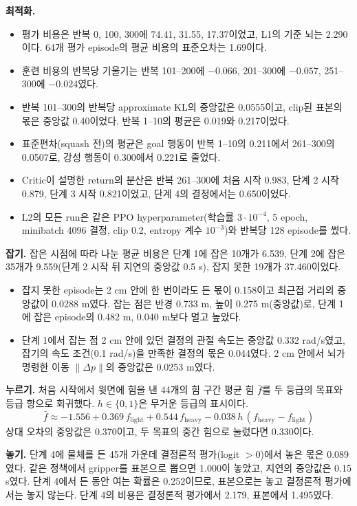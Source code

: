 \documentclass[11pt]{article}\usepackage[margin=1in]{geometry}\usepackage{amsmath,amssymb,amsthm,mathtools}\usepackage{graphicx}\graphicspath{{figures/}{../figures/}{figs/}{./}}\usepackage{enumitem}\usepackage{hyperref}\usepackage{cleveref}\usepackage{tikz}\usetikzlibrary{arrows.meta,positioning,calc,shapes.geometric}\usepackage{float}\usepackage{rotating}\usepackage[most]{tcolorbox}\usepackage{kotex}\usepackage{booktabs}\usepackage{longtable}\emergencystretch=1.6em\tolerance=2000 \crefname{assumption}{Assumption}{Assumptions}\Crefname{assumption}{Assumption}{Assumptions}\crefname{definition}{Definition}{Definitions}\Crefname{definition}{Definition}{Definitions}\crefname{proposition}{Proposition}{Propositions}\Crefname{proposition}{Proposition}{Propositions}\crefname{fact}{Fact}{Facts}\Crefname{fact}{Fact}{Facts} \newtheorem{assumption}{Assumption}\newtheorem{definition}{Definition}\newtheorem{lemma}{Lemma}\newtheorem{proposition}{Proposition}\newtheorem{theorem}{Theorem}\newtheorem{corollary}{Corollary}\newtheorem{fact}{Fact}\theoremstyle{remark}\newtheorem{remark}{Remark} \newcommand{\R}{\mathbb{R}}\newcommand{\xb}{\bar x}\newcommand{\Ab}{\bar A}\newcommand{\By}{\bar B_y}\newcommand{\U}{\mathcal U}\newcommand{\Z}{\mathcal Z}
\begin{document}
\textbf{최적화.}
\begin{itemize}
\item 평가 비용은 반복 0, 100, 300에 74.41, 31.55, 17.37이었고, L1의 기준 뇌는 2.290이다. 64개 평가 episode의 평균 비용의 표준오차는 1.69이다.
\item 훈련 비용의 반복당 기울기는 반복 101--200에 $-0.066$, 201--300에 $-0.057$, 251--300에 $-0.024$였다.
\item 반복 101--300의 반복당 approximate KL의 중앙값은 0.0555이고, clip된 표본의 몫은 중앙값 0.40이었다. 반복 1--10의 평균은 0.019와 0.217이었다.
\item 표준편차(squash 전)의 평균은 goal 행동이 반복 1--10의 0.211에서 261--300의 0.0507로, 강성 행동이 0.300에서 0.221로 줄었다.
\item Critic이 설명한 return의 분산은 반복 261--300에 처음 시작 0.983, 단계 2 시작 0.879, 단계 3 시작 0.821이었고, 단계 4의 결정에서는 0.650이었다.
\item L2의 모든 run은 같은 PPO hyperparameter(학습률 $3\cdot10^{-4}$, 5 epoch, minibatch 4096 결정, clip 0.2, entropy 계수 $10^{-3}$)와 반복당 128 episode를 썼다.
\end{itemize}

\textbf{잡기.} 잡은 시점에 따라 나눈 평균 비용은 단계 1에 잡은 10개가 6.539, 단계 2에 잡은 35개가 9.559(단계 2 시작 뒤 지연의 중앙값 0.5 s), 잡지 못한 19개가 37.460이었다.
\begin{itemize}
\item 잡지 못한 episode는 2 cm 안에 한 번이라도 든 몫이 0.158이고 최근접 거리의 중앙값이 0.0288 m였다. 잡는 점은 반경 0.733 m, 높이 0.275 m(중앙값)로, 단계 1에 잡은 episode의 0.482 m, 0.040 m보다 멀고 높았다.
\item 단계 1에서 잡는 점 2 cm 안에 있던 결정의 관절 속도는 중앙값 0.332 rad/s였고, 잡기의 속도 조건(0.1 rad/s)을 만족한 결정의 몫은 0.044였다. 2 cm 안에서 뇌가 명령한 이동 $\|\Delta p\|$의 중앙값은 0.0253 m였다.
\end{itemize}

\textbf{누르기.} 처음 시작에서 윗면에 힘을 낸 44개의 힘 구간 평균 힘 $\bar f$를 두 등급의 목표와 등급 항으로 회귀했다. $h\in\{0,1\}$은 무거운 등급의 표시이다.
\[
\bar f\approx-1.556+0.369\,f_{\mathrm{light}}+0.544\,f_{\mathrm{heavy}}-0.038\,h\,(f_{\mathrm{heavy}}-f_{\mathrm{light}})
\]
상대 오차의 중앙값은 0.370이고, 두 목표의 중간 힘으로 눌렀다면 0.330이다.

\textbf{놓기.} 단계 4에 물체를 든 45개 가운데 결정론적 평가(logit $>0$)에서 놓은 몫은 0.089였다. 같은 정책에서 gripper를 표본으로 뽑으면 1.000이 놓았고, 지연의 중앙값은 0.15 s였다. 단계 4에서 든 동안 여는 확률은 0.252이므로, 표본으로는 놓고 결정론적 평가에서는 놓지 않는다. 단계 4의 비용은 결정론적 평가에서 2.179, 표본에서 1.495였다.
\end{document}
